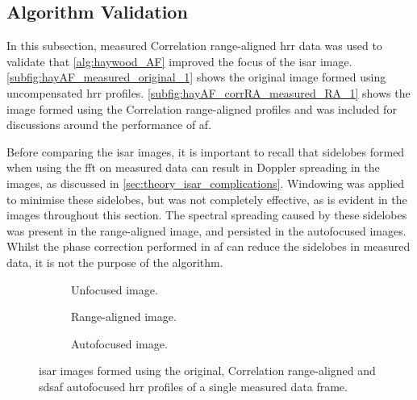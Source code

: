 \documentclass[class=report,11pt,crop=false]{standalone}
\begin{document}
    \subsection{Algorithm Validation}
    In this subsection, measured Correlation range-aligned \gls{hrr} data was used to validate that \autoref{alg:haywood_AF} improved the focus of the \gls{isar} image. \autoref{subfig:hayAF_measured_original_1} shows the original image formed using uncompensated \gls{hrr} profiles. \autoref{subfig:hayAF_corrRA_measured_RA_1} shows the image formed using the Correlation range-aligned profiles and was included for discussions around the performance of \gls{af}. 

    Before comparing the \gls{isar} images, it is important to recall that sidelobes formed when using the \gls{fft} on measured data can result in Doppler spreading in the images, as discussed in \autoref{sec:theory_isar_complications}. Windowing was applied to minimise these sidelobes, but was not completely effective, as is evident in the images throughout this section. The spectral spreading caused by these sidelobes was present in the range-aligned image, and persisted in the autofocused images. Whilst the phase correction performed in \gls{af} can reduce the sidelobes in measured data, it is not the purpose of the algorithm.
    
    \begin{figure}[H]
        \centering
        \begin{subfigure}{0.3\linewidth}
            \resizebox{\linewidth}{!}{}
            \caption{Unfocused image. \label{subfig:hayAF_measured_original_1}}
        \end{subfigure}
        \hspace{0.5cm}
        \begin{subfigure}{0.3\linewidth}
            \resizebox{\linewidth}{!}{}
            \caption{Range-aligned image. \label{subfig:hayAF_corrRA_measured_RA_1}}
        \end{subfigure}
        \hspace{0.5cm}
        \begin{subfigure}{0.3\linewidth}
            \resizebox{\linewidth}{!}{}
            \caption{Autofocused image.\label{subfig:hayAF_corrRA_measured_AF_1}}
        \end{subfigure}
        \caption{\gls{isar} images formed using the original, Correlation range-aligned and \gls{sdsaf} autofocused \gls{hrr} profiles of a single measured data frame.} \label{subfig:hayAF_corrRA_measured_1}
    \end{figure}
\end{document}

